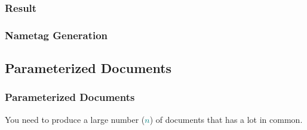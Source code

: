 {\subsubsection{Result}
\begin{frame}[fragile]
  \frametitle{Nametag Generation }
  \vspace{3mm}
\end{frame}

\subsection{Parameterized Documents}
\begin{frame}[fragile]
  \frametitle{Parameterized Documents}
  \vspace{2mm}
  You need to produce a large number (\textcolor{teal}{$n$}) of documents that has a lot in common.
  

\end{frame}}
